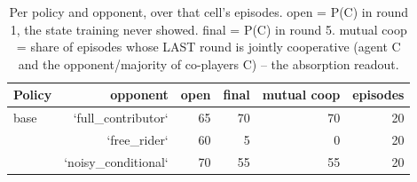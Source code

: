 \begin{table}[t]
\centering
\caption{Per policy and opponent, over that cell's episodes. open = P(C) in round 1, the state training never showed. final = P(C) in round 5. mutual coop = share of episodes whose LAST round is jointly cooperative (agent C and the opponent/majority of co-players C) -- the absorption readout.}
\label{tab:mr-outcomes}
\small
\setlength{\tabcolsep}{3.5pt}
\begin{tabular}{lrrrrr}
\toprule
Policy & opponent & open & final & mutual coop & episodes \\
\midrule
base & `full_contributor` & 65 & 70 & 70 & 20 \\
 & `free_rider` & 60 & 5 & 0 & 20 \\
 & `noisy_conditional` & 70 & 55 & 55 & 20 \\
\bottomrule
\end{tabular}
\end{table}
